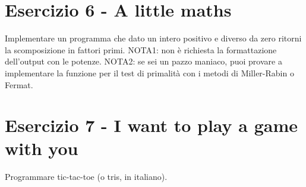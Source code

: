 \documentclass{article}
\begin{document}
\section*{Esercizio 6 - A little maths}
    Implementare un programma che dato un intero positivo e diverso da zero ritorni la scomposizione in fattori primi.
    NOTA1: non è richiesta la formattazione dell'output con le potenze.
    NOTA2: se sei un pazzo maniaco, puoi provare a implementare la funzione per il test di primalità con i metodi di Miller-Rabin o Fermat.
    
\section{Esercizio 7 - I want to play a game with you}
    Programmare tic-tac-toe (o tris, in italiano).
    
\end{document}
